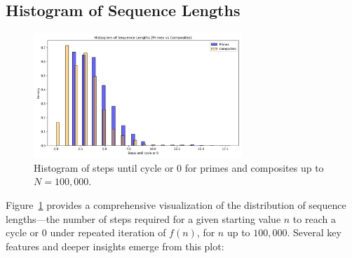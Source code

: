\documentclass[12pt]{article}
\begin{document}
\subsection{Histogram of Sequence Lengths}
\begin{figure}[H]
    \centering
    \includegraphics[width=0.7\textwidth]{fig_histogram_sequence_lengths.png}
    \caption{Histogram of steps until cycle or $0$ for primes and composites up to $N=100,000$.}
    \label{fig:histogram}
\end{figure}


Figure~\ref{fig:histogram} provides a comprehensive visualization of the distribution of sequence lengths---the number of steps required for a given starting value $n$ to reach a cycle or $0$ under repeated iteration of $f(n)$, for $n$ up to $100,000$. Several key features and deeper insights emerge from this plot:
\end{document}
